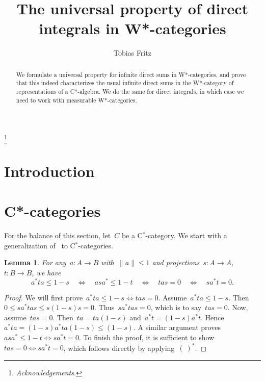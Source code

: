 \documentclass[reqno,T1]{amsproc}
\theoremstyle{plain}
\newtheorem{lem}[thm]{Lemma}
\theoremstyle{remark}
\numberwithin{equation}{section}
\begin{document}
\sloppy

\setlength{\jot}{6pt}



\title{The universal property of direct integrals in W*-categories}

\author{Tobias Fritz}

\address{Max Planck Institute for Mathematics in the Sciences, Leipzig, Germany}

\keywords{}


\thanks{\textit{Acknowledgements.} }

\begin{abstract}
We formulate a universal property for infinite direct sums in W*-categories, and prove that this indeed characterizes the usual infinite direct sums in the W*-category of representations of a C*-algebra. We do the same for direct integrals, in which case we need to work with measurable W*-categories.
\end{abstract}

\maketitle

\section{Introduction}

\section{C*-categories}
For the balance of this section, let~$C$ be a C$^*$-category. \cite{wstarcat}
We start with a generalization of~\cite[Lemma 7]{westerbaan2016universal}
    to C$^*$-categories.
\begin{lem}
For any~$a\colon A \to B$ with~$\|a\| \leq 1$
    and projections~$s \colon A \to A$,
        $t\colon B\to B$,
    we have
    \begin{equation*}
     a^* t a \leq 1-s \quad\iff\quad
    a s a^* \leq 1 - t \quad\iff\quad
    tas = 0 \quad\iff\quad
    sa^* t = 0.
    \end{equation*}\label{contrapositionlemma}
\end{lem}
\begin{proof}
We will first prove~$a^*t a \leq 1-s \Leftrightarrow tas=0$.
    Assume~$a^* t a \leq 1-s$.
    Then~$0 \leq s a^* t a s \leq s (1-s) s = 0$.
    Thus~$s a^* t a s = 0$, which is to say~$tas = 0$.
    Now, assume~$tas = 0$.
    Then~$ta = ta(1-s)$ and~$a^*t = (1-s)a^* t$.
    Hence~$a^* ta = (1-s)a^*ta(1-s) \leq (1-s)$.
A similar argument proves~$as a^* \leq 1-t \Leftrightarrow sa^*t=0$.
To finish the proof, it is sufficient to
        show~$tas=0 \Leftrightarrow sa^*t=0$, which follows directly
        by applying~$(\ )^*$.
\end{proof}
\end{document}
